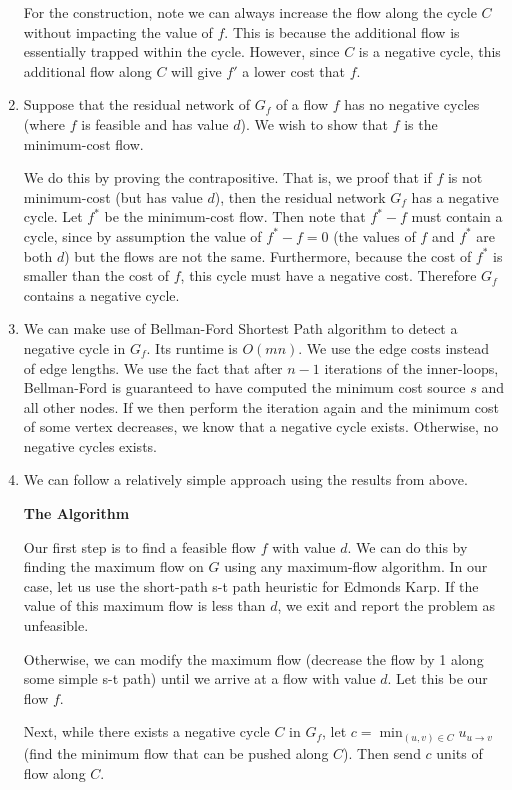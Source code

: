 \documentclass[12pt]{exam}
\begin{document}
\begin{questions}
\begin{solution}
\begin{enumerate}[label=(\alph*)]
      For the construction, note we can always increase the flow along the cycle $C$ without impacting the value of $f$. This is because the additional flow is essentially trapped within the cycle. However, since $C$ is a negative cycle, this additional flow along $C$ will give $f'$ a lower cost that $f$.

    \item 
      Suppose that the residual network of $G_f$ of a flow $f$ has no negative cycles (where $f$ is feasible and has value $d$). We wish to show that $f$ is the minimum-cost flow. 

      We do this by proving the contrapositive. That is, we proof that if $f$ is not minimum-cost (but has value $d$), then the residual network $G_f$ has a negative cycle. Let $f^*$ be the minimum-cost flow. Then note that $f^* - f$ must contain a cycle, since by assumption the value of $f^* - f = 0$ (the values of $f$ and $f^*$ are both $d$) but the flows are not the same. Furthermore, because the cost of $f^*$ is smaller than the cost of $f$, this cycle must have a negative cost. Therefore $G_f$ contains a negative cycle.

    \item
      We can make use of Bellman-Ford Shortest Path algorithm to detect a negative cycle in $G_f$. Its runtime is $O(mn)$. We use the edge costs instead of edge lengths. We use the fact that after $n-1$ iterations of the inner-loops, Bellman-Ford is guaranteed to have computed the minimum cost source $s$ and all other nodes. If we then perform the iteration again and the minimum cost of some vertex decreases, we know that a negative cycle exists. Otherwise, no negative cycles exists.

    \item
      We can follow a relatively simple approach using the results from above.

      \textbf{The Algorithm}

      Our first step is to find a feasible flow $f$ with value $d$. We can do this by finding the maximum flow on $G$ using any maximum-flow algorithm. In our case, let us use the short-path s-t path heuristic for Edmonds Karp. If the value of this maximum flow is less than $d$, we exit and report the problem as unfeasible.

      Otherwise, we can modify the maximum flow (decrease the flow by 1 along some simple s-t path) until we arrive at a flow with value $d$. Let this be our flow $f$.

      Next, while there exists a negative cycle $C$ in $G_f$, let $c = \min_{(u,v) \in C} u_{u\to v}$ (find the minimum flow that can be pushed along $C$). Then send $c$ units of flow along $C$.


\end{enumerate}
\end{solution}
\end{questions}
\end{document}
